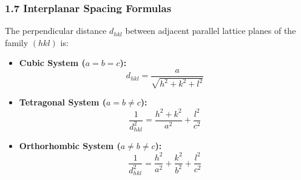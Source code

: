 \documentclass[11pt,a4paper]{article}
\begin{document}
\subsubsection{1.7 Interplanar Spacing Formulas}
The perpendicular distance $d_{hkl}$ between adjacent parallel lattice planes of the family $(hkl)$ is:
\begin{itemize}[leftmargin=1.5em]
    \item \textbf{Cubic System ($a=b=c$):}
    \begin{equation}
    d_{hkl} = \frac{a}{\sqrt{h^2 + k^2 + l^2}}
    \end{equation}
    \item \textbf{Tetragonal System ($a=b\neq c$):}
    \begin{equation}
    \frac{1}{d_{hkl}^2} = \frac{h^2 + k^2}{a^2} + \frac{l^2}{c^2}
    \end{equation}
    \item \textbf{Orthorhombic System ($a\neq b\neq c$):}
    \begin{equation}
    \frac{1}{d_{hkl}^2} = \frac{h^2}{a^2} + \frac{k^2}{b^2} + \frac{l^2}{c^2}
    \end{equation}
\end{itemize}
\end{document}
